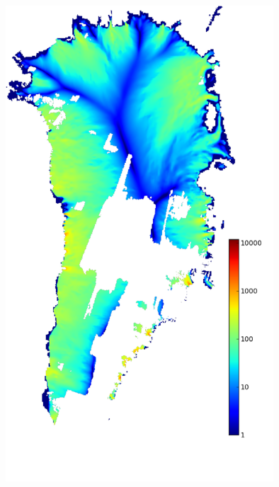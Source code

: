 \documentclass{beamer}
\begin{document}
\begin{frame}
\begin{columns}
\begin{column}{0.4\textwidth}
\begin{center}
  \includegraphics[width=0.75\textwidth]{g3km_3_25_98}
\end{center}
\end{column}
\end{columns}
\end{frame}
\end{document}
